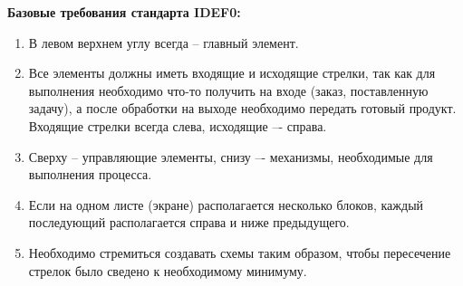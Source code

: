 \documentclass[a4paper, final]{article}
\begin{document}
{\bf Базовые требования стандарта IDEF0:}
\begin{enumerate}
	\item В левом верхнем углу всегда -- главный элемент.
	\item Все элементы должны иметь входящие и исходящие стрелки, так как для выполнения необходимо что-то
	получить на входе (заказ, поставленную задачу), а после обработки на выходе необходимо передать готовый
	продукт. Входящие стрелки всегда слева, исходящие –- справа.
	\item Сверху – управляющие элементы, снизу –- механизмы, необходимые для выполнения процесса.
	\item Если на одном листе (экране) располагается несколько блоков, каждый последующий располагается справа
	и ниже предыдущего.
	\item Необходимо стремиться создавать схемы таким образом, чтобы пересечение стрелок 
	было сведено к необходимому минимуму. \cite{bib:gost_idef0}
\end{enumerate}


\newpage
\end{document}
